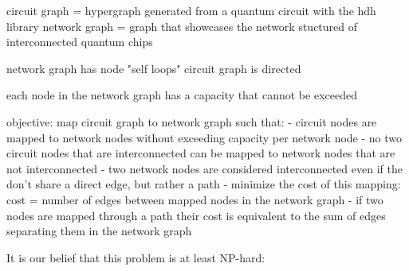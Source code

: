 circuit graph = hypergraph generated from a quantum circuit with the hdh library
network graph = graph that showcases the network stuctured of interconnected quantum chips

network graph has node "self loops"
circuit graph is directed

each node in the network graph has a capacity that cannot be exceeded

objective: map circuit graph to network graph such that:
 - circuit nodes are mapped to network nodes without exceeding capacity per network node 
 - no two circuit nodes that are interconnected can be mapped to network nodes that are not interconnected
    - two network nodes are considered interconnected even if the don't share a direct edge, but rather a path
- minimize the cost of this mapping: cost = number of edges between mapped nodes in the network graph
 - if two nodes are mapped through a path their cost is equivalent to the sum of edges separating them in the network graph

 It is our belief that this problem is at least NP-hard:

